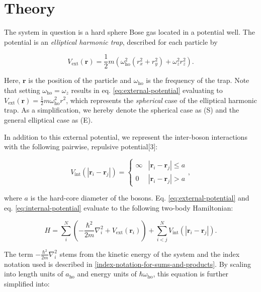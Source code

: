 \documentclass[
]{article}
\begin{document}
\hypertarget{theory}{%
\section{Theory}\label{theory}}

The system in question is a hard sphere Bose gas located in a potential
well. The potential is an \emph{elliptical harmonic trap}, described for
each particle by

\begin{equation}V_\text{ext}(\mathbf r) = \frac{1}{2}m\left(\omega_\text{ho}^2(r_x^2 + r_y^2) + \omega_z^2 r_z^2\right).\label{eq:external-potential}\end{equation}

Here, \(\mathbf r\) is the position of the particle and
\(\omega_\text{ho}\) is the frequency of the trap. Note that setting
\(\omega_\text{ho} = \omega_z\) results in eq.
\eqref{eq:external-potential} evaluating to
\(V_\text{ext}(\mathbf r) = \frac{1}{2}m\omega_\text{ho}^2r^2\), which
represents the \emph{spherical} case of the elliptical harmonic trap. As
a simplification, we hereby denote the spherical case as (S) and the
general elliptical case as (E).

In addition to this external potential, we represent the inter-boson
interactions with the following pairwise, repulsive potential{[}3{]}:

\begin{equation}V_\text{int}(|\mathbf r_i - \mathbf r_j|) = \begin{cases}\infty & |\mathbf r_i - \mathbf r_j| \le a \\ 0 & |\mathbf r_i - \mathbf r_j| > a\end{cases},\label{eq:internal-potential}\end{equation}

where \(a\) is the hard-core diameter of the bosons. Eq.
\eqref{eq:external-potential} and eq. \eqref{eq:internal-potential}
evaluate to the following two-body Hamiltonian:

\begin{equation}H = \sum_i^N\left(-\frac{\hbar^2}{2m}\nabla_i^2 + V_\text{ext}(\mathbf r_i)\right) + \sum_{i < j}^N V_\text{int} (|\mathbf r_i - \mathbf r_j|).\label{eq:hamiltonian}\end{equation}

The term \(-\frac{\hbar^2}{2m}\nabla_i^2\) stems from the kinetic energy
of the system and the index notation used is described in
\ref{index-notation-for-sums-and-products}. By scaling into length units
of \(a_\text{ho}\) and energy units of \(\hbar\omega_\text{ho}\), this
equation is further simplified into:
\end{document}

